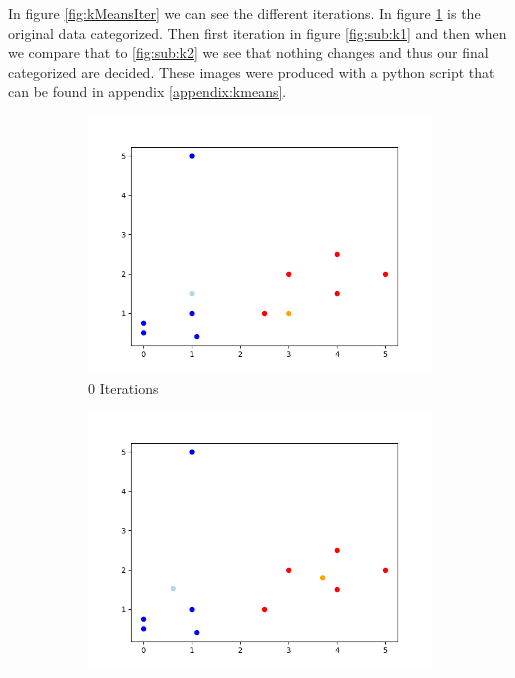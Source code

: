 \documentclass{article}
\begin{document}
    In figure \ref{fig:kMeansIter} we can see the different iterations. In figure \ref{fig:sub:k0} is the original data categorized. Then first iteration in figure \ref{fig:sub:k1} and then when we compare that to \ref{fig:sub:k2} we see that nothing changes and thus our final categorized are decided. These images were produced with a python script that can be found in appendix \ref{appendix:kmeans}.
    \begin{figure}[H]
        \centering
        \begin{subfigure}{0.32\textwidth}
            \centering
            \includegraphics[width=1\textwidth]{k0.png}
            \caption{0 Iterations}
            \label{fig:sub:k0}
        \end{subfigure}
        \begin{subfigure}{0.32\textwidth}
            \centering
            \includegraphics[width=1\textwidth]{k1.png}

\end{subfigure}
\end{figure}
\end{document}
